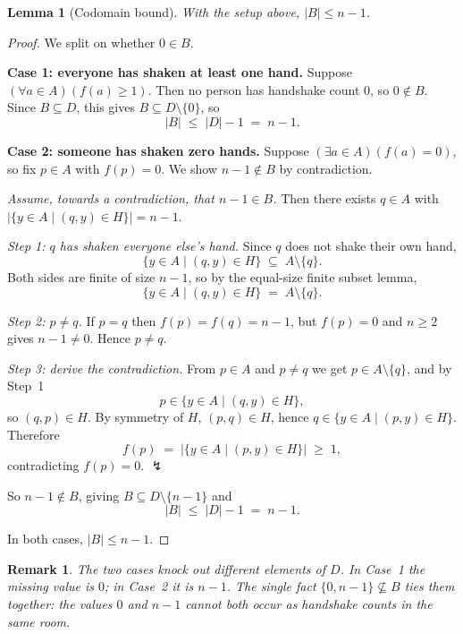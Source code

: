 \documentclass[11pt]{article}
\theoremstyle{defstyle}
\theoremstyle{thmstyle}
\newtheorem{lemma}[theorem]{Lemma}
\theoremstyle{notstyle}
\newtheorem*{remark}{Remark}
\theoremstyle{cautionstyle}
\newcommand{\hcount}[1]{\bigl|\{y \in A \mid (#1, y) \in H\}\bigr|}
\begin{document}
\begin{thmbox}
\begin{lemma}[Codomain bound]
With the setup above, $|B| \leq n - 1$.
\end{lemma}
\begin{proof}
We split on whether $0 \in B$.

\medskip
\noindent\textbf{Case 1: everyone has shaken at least one hand.}
Suppose $(\forall a \in A)(f(a) \geq 1)$. Then no person has handshake
count $0$, so $0 \notin B$. Since $B \subseteq D$, this gives
$B \subseteq D \setminus \{0\}$, so
\[
  |B| \;\leq\; |D| - 1 \;=\; n - 1.
\]

\medskip
\noindent\textbf{Case 2: someone has shaken zero hands.}
Suppose $(\exists a \in A)(f(a) = 0)$, so fix $p \in A$ with $f(p) = 0$.
We show $n - 1 \notin B$ by contradiction.

\smallskip
\noindent\emph{Assume, towards a contradiction, that $n - 1 \in B$.}
Then there exists $q \in A$ with $\hcount{q} = n - 1$.

\smallskip
\noindent\emph{Step 1: $q$ has shaken everyone else's hand.} Since $q$
does not shake their own hand,
\[
  \{y \in A \mid (q,y) \in H\} \;\subseteq\; A \setminus \{q\}.
\]
Both sides are finite of size $n - 1$, so by the equal-size finite
subset lemma,
\[
  \{y \in A \mid (q,y) \in H\} \;=\; A \setminus \{q\}.
\]

\medskip
\noindent\emph{Step 2: $p \neq q$.} If $p = q$ then
$f(p) = f(q) = n - 1$, but $f(p) = 0$ and $n \geq 2$ gives
$n - 1 \neq 0$. Hence $p \neq q$.

\medskip
\noindent\emph{Step 3: derive the contradiction.} From $p \in A$ and
$p \neq q$ we get $p \in A \setminus \{q\}$, and by Step~1
\[
  p \in \{y \in A \mid (q, y) \in H\},
\]
so $(q, p) \in H$. By symmetry of $H$, $(p, q) \in H$, hence
$q \in \{y \in A \mid (p, y) \in H\}$. Therefore
\[
  f(p) \;=\; \hcount{p} \;\geq\; 1,
\]
contradicting $f(p) = 0$. \quad$\lightning$

\medskip
\noindent So $n - 1 \notin B$, giving $B \subseteq D \setminus \{n-1\}$
and
\[
  |B| \;\leq\; |D| - 1 \;=\; n - 1.
\]

\medskip
In both cases, $|B| \leq n - 1$.
\end{proof}
\end{thmbox}

\begin{notebox}
\begin{remark}
The two cases knock out different elements of $D$. In Case~1 the missing
value is $0$; in Case~2 it is $n - 1$. The single fact
$\{0, n-1\} \not\subseteq B$ ties them together: the values $0$ and
$n - 1$ cannot both occur as handshake counts in the same room.
\end{remark}
\end{notebox}
\end{document}
